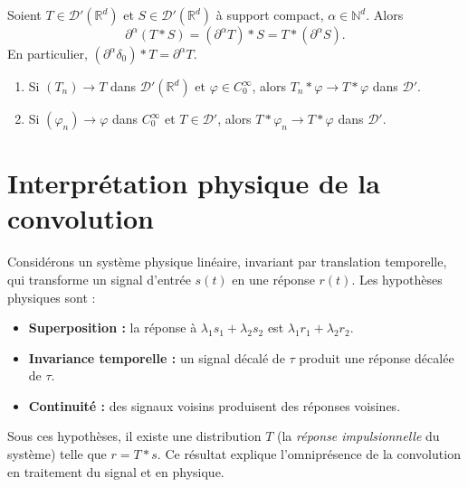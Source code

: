 \documentclass[12pt,a4paper,openany]{book}
\theoremstyle{definition}
\theoremstyle{plain}
\theoremstyle{remark}
\begin{document}
	\begin{proposition}
		Soient $T \in \mathcal{D}'(\mathbb{R}^d)$ et $S \in \mathcal{D}'(\mathbb{R}^d)$ à support compact, $\alpha \in \mathbb{N}^d$. Alors
		\[
		\partial^\alpha(T * S) = (\partial^\alpha T) * S = T * (\partial^\alpha S).
		\]
		En particulier, $(\partial^\alpha \delta_0) * T = \partial^\alpha T$.
	\end{proposition}
	
	\begin{proposition}[Continuité]
		\begin{enumerate}[label=(\arabic*)]
			\item Si $(T_n) \to T$ dans $\mathcal{D}'(\mathbb{R}^d)$ et $\varphi \in C_0^\infty$, alors $T_n * \varphi \to T * \varphi$ dans $\mathcal{D}'$.
			\item Si $(\varphi_n) \to \varphi$ dans $C_0^\infty$ et $T \in \mathcal{D}'$, alors $T * \varphi_n \to T * \varphi$ dans $\mathcal{D}'$.
		\end{enumerate}
	\end{proposition}
	
	\section{Interprétation physique de la convolution}
	
	Considérons un système physique linéaire, invariant par translation temporelle, qui transforme un signal d'entrée $s(t)$ en une réponse $r(t)$. Les hypothèses physiques sont :
	\begin{itemize}
		\item \textbf{Superposition :} la réponse à $\lambda_1 s_1 + \lambda_2 s_2$ est $\lambda_1 r_1 + \lambda_2 r_2$.
		\item \textbf{Invariance temporelle :} un signal décalé de $\tau$ produit une réponse décalée de $\tau$.
		\item \textbf{Continuité :} des signaux voisins produisent des réponses voisines.
	\end{itemize}
	
	Sous ces hypothèses, il existe une distribution $T$ (la \emph{réponse impulsionnelle} du système) telle que $r = T * s$. Ce résultat explique l'omniprésence de la convolution en traitement du signal et en physique.
	
\end{document}
